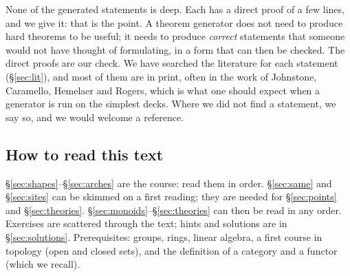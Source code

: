 None of the generated statements is deep. Each has a direct proof of a few lines, and we give it: that is the point. A theorem generator does not need to produce hard theorems to be useful; it needs to produce \emph{correct} statements that someone would not have thought of formulating, in a form that can then be checked. The direct proofs are our check. We have searched the literature for each statement (\S\ref{sec:lit}), and most of them are in print, often in the work of Johnstone, Caramello, Hemelaer and Rogers, which is what one should expect when a generator is run on the simplest decks. Where we did not find a statement, we say so, and we would welcome a reference.

\subsection{How to read this text}

\S\ref{sec:shapes}--\S\ref{sec:arches} are the course: read them in order. \S\ref{sec:same} and \S\ref{sec:sites} can be skimmed on a first reading; they are needed for \S\ref{sec:points} and \S\ref{sec:theories}. \S\ref{sec:monoids}--\S\ref{sec:theories} can then be read in any order. Exercises are scattered through the text; hints and solutions are in \S\ref{sec:solutions}. Prerequisites: groups, rings, linear algebra, a first course in topology (open and closed sets), and the definition of a category and a functor (which we recall).
